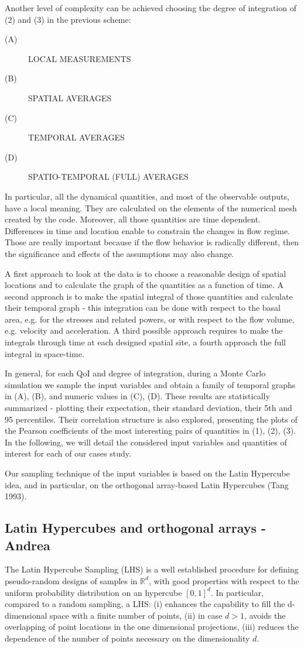 \documentclass{article}
\begin{document}
Another level of complexity can be achieved choosing the degree of integration of (2) and (3) in the previous scheme:
\begin{description}
  \item[(A)] LOCAL MEASUREMENTS
  \item[(B)] SPATIAL AVERAGES
  \item[(C)] TEMPORAL AVERAGES
  \item[(D)] SPATIO-TEMPORAL (FULL) AVERAGES
\end{description}

In particular, all the dynamical quantities, and most of the observable outputs, have a local meaning. They are calculated on the elements of the numerical mesh created by the code. Moreover, all those quantities are time dependent. Differences in time and location enable to constrain the changes in flow regime. Those are really important because if the flow behavior is radically different, then the significance and effects of the assumptions may also change.

A first approach to look at the data is to choose a reasonable design of spatial locations and to calculate the graph of the quantities as a function of time. A second approach is to make the spatial integral of those quantities and calculate their temporal graph - this integration can be done with respect to the basal area, e.g. for the stresses and related powers, or with respect to the flow volume, e.g. velocity and acceleration. A third possible approach requires to make the integrals through time at each designed spatial site, a fourth approach the full integral in space-time.

In general, for each QoI and degree of integration, during a Monte Carlo simulation we sample the input variables and obtain a family of temporal graphs in (A), (B), and numeric values in (C), (D). These results are statistically summarized - plotting their expectation, their standard deviation, their 5th and 95 percentiles. Their correlation structure is also explored, presenting the plots of the Pearson coefficients of the most interesting pairs of quantities in (1), (2), (3). In the following, we will detail the considered input variables and quantities of interest for each of our cases study.

Our sampling technique of the input variables is based on the Latin Hypercube idea, and in particular, on the orthogonal array-based Latin Hypercubes (Tang 1993).

\subsection{Latin Hypercubes and orthogonal arrays - Andrea}
The Latin Hypercube Sampling (LHS) is a well established procedure for defining pseudo-random designs of samples in $\mathbb R^d$, with good properties with respect to the uniform probability distribution on an hypercube $[0,1]^d$. In particular, compared to a random sampling, a LHS: (i) enhances the capability to fill the d-dimensional space with a finite number of points, (ii) in case $d>1$, avoids the overlapping of point locations in the one dimensional projections, (iii) reduces the dependence of the number of points necessary on the dimensionality $d$.
\end{document}

